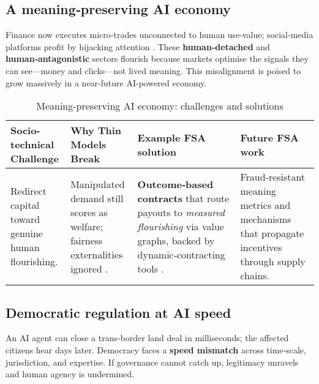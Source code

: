 \subsection{A meaning‑preserving AI economy}
Finance now executes micro‑trades unconnected to human use‑value; social‑media platforms profit by hijacking attention \cite{orlowski2020}. These \textbf{human‑detached} and \textbf{human‑antagonistic} sectors flourish because markets optimise the signals they can see—money and clicks—not lived meaning. This misalignment is poised to grow massively in a near-future AI-powered economy.

\begin{table*}[!htbp]
    \centering
    \small
    \begin{tabular}{p{}p{}p{}p{}}
        \toprule
        \textbf{Socio-technical Challenge} & \textbf{Why Thin Models Break} & \textbf{Example FSA solution} & \textbf{Future FSA work} \\
        \midrule
        Redirect capital toward genuine human flourishing. &
        Manipulated demand still scores as welfare; fairness externalities ignored \cite{fehr1999}. &
        \textbf{Outcome‑based contracts} that route payouts to \textit{measured flourishing} via value graphs, backed by dynamic‑contracting tools \cite{philippon2015}. &
        Fraud‑resistant meaning metrics and mechanisms that propagate incentives through supply chains. \\
        \bottomrule
    \end{tabular}
    \caption{Meaning-preserving AI economy: challenges and solutions}
    \label{tab:meaning-economy}
\end{table*}

\subsection{Democratic regulation at AI speed}
An AI agent can close a trans‑border land deal in milliseconds; the affected citizens hear days later. Democracy faces a \textbf{speed mismatch} across time‑scale, jurisdiction, and expertise. If governance cannot catch up, legitimacy unravels and human agency is undermined.

